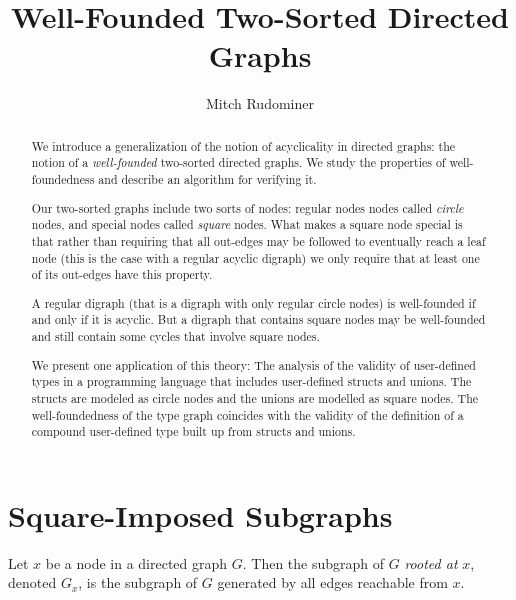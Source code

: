 \documentclass[oneside,12pt]{amsart}
\begin{document}
\title{Well-Founded Two-Sorted Directed Graphs}
\author{Mitch Rudominer}


\begin{abstract}
We introduce a generalization of the notion of acyclicality in directed graphs:
the notion of a \emph{well-founded} two-sorted directed graphs. We study the
properties of well-foundedness and describe an algorithm for verifying it.

Our two-sorted graphs include two sorts of nodes: regular nodes
nodes called \emph{circle} nodes, and special nodes called \emph{square} nodes.
What makes a square node special is that rather than requiring that all
out-edges may be followed to eventually reach a leaf node (this is the
case with a regular acyclic digraph) we only require that at least one
of its out-edges have this property.

A regular digraph (that is a digraph with only regular circle nodes) is
well-founded if and only if it is acyclic. But a digraph that contains square
nodes may be well-founded and still contain some cycles that involve square
nodes.

We present one application of this theory: The analysis of the validity of
user-defined types in a programming language that includes user-defined structs and unions.
The structs are modeled as circle nodes and the unions are modelled as square
nodes. The well-foundedness of the type graph coincides with the validity
of the definition of a compound user-defined type built up from structs and unions.
\end{abstract}

\maketitle

\tableofcontents


\section{Square-Imposed Subgraphs}

\begin{definition}
Let $x$ be a node in a directed graph $G$. Then the subgraph of $G$ \emph{rooted at} $x$,
denoted $G_x$, is the subgraph of $G$ generated by all edges reachable from $x$.
\end{definition}
\end{document}
